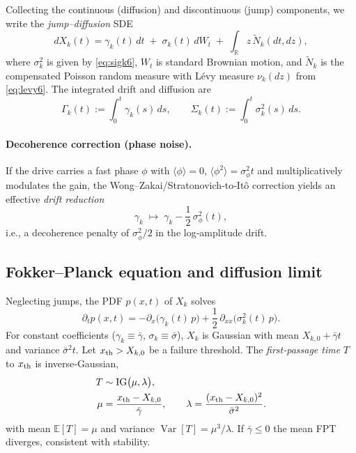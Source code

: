 \documentclass[aps,pre,twocolumn,showpacs,superscriptaddress]{revtex4-2}
\theoremstyle{definition}
\newcommand{\RR}{\mathbb{R}}
\newcommand{\EE}{\mathbb{E}}
\newcommand{\Var}{\operatorname{Var}}
\begin{document}
Collecting the continuous (diffusion) and discontinuous (jump) components, we write the \emph{jump–diffusion} SDE
\begin{equation}\label{eq:SDE6}
dX_k(t) = \gamma_k(t)\,dt \;+\; \sigma_k(t)\,dW_t \;+\; \int_{\RR} z\,\tilde N_k(dt,dz),
\end{equation}
where $\sigma_k^2$ is given by \eqref{eq:sigk6}, $W_t$ is standard Brownian motion, and $\tilde N_k$ is the compensated Poisson random measure with L\'evy measure $\nu_k(dz)$ from \eqref{eq:levy6}. The integrated drift and diffusion are
\begin{equation}\label{eq:GammaSigma6}
\Gamma_k(t):=\int_0^t \gamma_k(s)\,ds,\qquad
\Sigma_k(t):=\int_0^t \sigma_k^2(s)\,ds.
\end{equation}

\paragraph*{Decoherence correction (phase noise).}
If the drive carries a fast phase $\phi$ with $\langle \phi\rangle=0$, $\langle \phi^2\rangle=\sigma_\phi^2 t$ and multiplicatively modulates the gain, the Wong–Zakai/Stratonovich‑to‑It\^o correction yields an effective \emph{drift reduction}
\begin{equation}\label{eq:decoh6}
\gamma_k \;\mapsto\; \gamma_k - \frac{1}{2}\,\sigma_\phi^2(t),
\end{equation}
i.e., a decoherence penalty of $\sigma_\phi^2/2$ in the log‑amplitude drift.

\subsection{Fokker–Planck equation and diffusion limit}\label{subsec:FP6}

Neglecting jumps, the PDF $p(x,t)$ of $X_k$ solves
\begin{equation}\label{eq:FP6}
\partial_t p(x,t)= -\partial_x\big(\gamma_k(t)\,p\big) + \frac{1}{2}\,\partial_{xx}\big(\sigma_k^2(t)\,p\big).
\end{equation}
For constant coefficients ($\gamma_k\equiv \bar\gamma$, $\sigma_k\equiv \bar\sigma$), $X_k$ is Gaussian with mean $X_{k,0}+\bar\gamma t$ and variance $\bar\sigma^2 t$. Let $x_{\rm th}>X_{k,0}$ be a failure threshold. The \emph{first‑passage time} $T$ to $x_{\rm th}$ is inverse‑Gaussian,
\begin{align}\label{eq:IG6}
T &\sim \mathrm{IG}\big(\mu,\lambda\big),\\
\mu &=\frac{x_{\rm th}-X_{k,0}}{\bar\gamma},\qquad
\lambda =\frac{(x_{\rm th}-X_{k,0})^2}{\bar\sigma^2}.\nonumber
\end{align}
with mean $\EE[T]=\mu$ and variance $\Var[T]=\mu^3/\lambda$. If $\bar\gamma\le 0$ the mean FPT diverges, consistent with stability.
\end{document}
